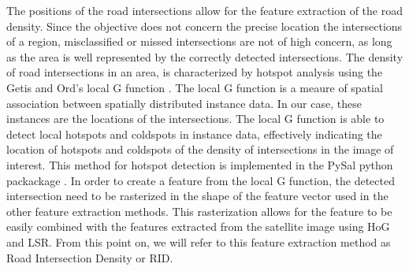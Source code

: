 The positions of the road intersections allow for the
feature extraction of the road density. Since the objective does not concern the
precise location the intersections of a region, misclassified or missed intersections are not of high concern, as long as the area is well represented by the correctly detected intersections. The density of road intersections in an area, is characterized by hotspot analysis using the Getis and Ord's local G function \cite{getis1992analysis}. The local G function is a meaure of spatial association between spatially distributed instance data. In our case, these instances are the locations of the intersections. The local G function is able to detect local hotspots and coldspots in instance data, effectively indicating the location of hotspots and coldspots of the density of intersections in the image of interest. This method for hotspot detection is implemented in the PySal python packackage \cite{rey2010pysal}. In order to create a feature from the local G function, the detected intersection need to be rasterized in the shape of the feature vector used in the other feature extraction methods. This rasterization allows for the feature to be easily combined with the features extracted from the satellite image using HoG and LSR. From this point on, we will refer to this feature extraction method as Road Intersection Density or RID.





